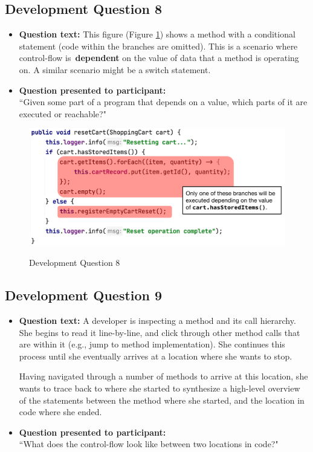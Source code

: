 \subsection{Development Question 8}

\begin{itemize}
  \item[] \textbf{Question text:} This figure (Figure \ref{fig:DS8}) shows a 
          method with a conditional statement (code within the branches are 
          omitted). This is a scenario where control-flow is \textbf{dependent} 
          on the value of data that a method is operating on. 
          A similar scenario might be a switch statement.
\item[] \textbf{Question presented to participant:}  \\
         ``Given some part of a program that depends on a value, which parts of 
         it are executed or reachable?"
\end{itemize}

\begin{figure}[ht!]
\centering
\caption{Development Question 8}
\includegraphics[width=\textwidth]{./figs/ds8.png}
\label{fig:DS8}
\end{figure}

\pagebreak

\subsection{Development Question 9}

\begin{itemize}
  \item[] \textbf{Question text:} A developer is inspecting a method and its 
          call hierarchy. She begins to read it line-by-line, and click through 
          other method calls that are within it (e.g., jump to method 
          implementation). She continues this process until she eventually 
          arrives at a location where she wants to stop.

         \par Having navigated through a number of methods to arrive at this 
         location, she wants to trace back to where she started to synthesize a 
         high-level overview of the statements between the method where she 
         started, and the location in code where she ended.
  \item[] \textbf{Question presented to participant:}  \\
         ``What does the control-flow look like between two locations in code?"
\end{itemize}
